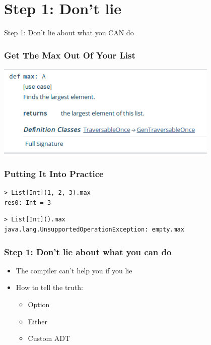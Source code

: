 \documentclass{beamer}
\begin{document}
\section{Step 1: Don't lie}

\begin{frame}[c]
  \begin{center}
    \Large Step 1: Don't lie about what you CAN do
  \end{center}
\end{frame}

\begin{frame}[fragile]
  \frametitle{Get The Max Out Of Your List}
  \includegraphics[width=0.8\textwidth]{../pics/list-max.png}
\end{frame}

\begin{frame}
  \frametitle{Putting It Into Practice}
  \begin{verbatim}
> List[Int](1, 2, 3).max
res0: Int = 3
\end{verbatim}
\begin{verbatim}
> List[Int]().max                                                             
java.lang.UnsupportedOperationException: empty.max                                 
\end{verbatim}
\end{frame}

\begin{frame}
  \frametitle{Step 1: Don't lie about what you can do}
  \begin{itemize}
  \item The compiler can't help you if you lie
  \item How to tell the truth:
    \begin{itemize}
    \item Option
    \item Either
    \item Custom ADT
    \end{itemize}
  \end{itemize}
\end{frame}
\end{document}
